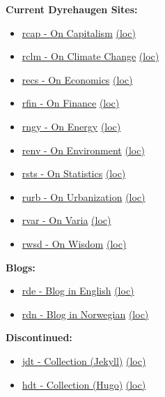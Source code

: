 \documentclass[
]{book}
\providecommand{\tightlist}{%
  \setlength{\itemsep}{0pt}\setlength{\parskip}{0pt}}
\begin{document}
\textbf{Current Dyrehaugen Sites:}

\begin{itemize}
\tightlist
\item
  \href{https://dyrehaugen.github.io/rcap}{rcap - On Capitalism} \href{http://localhost/rcap}{(loc)}
\item
  \href{https://dyrehaugen.github.io/rclm}{rclm - On Climate Change} \href{http://localhost/rclm}{(loc)}
\item
  \href{https://dyrehaugen.github.io/recs}{recs - On Economics} \href{http://localhost/recs}{(loc)}
\item
  \href{https://dyrehaugen.github.io/rngy}{rfin - On Finance} \href{http://localhost/rfin}{(loc)}
\item
  \href{https://dyrehaugen.github.io/rngy}{rngy - On Energy} \href{http://localhost/rngy}{(loc)}
\item
  \href{https://dyrehaugen.github.io/renv}{renv - On Environment} \href{http://localhost/renv}{(loc)}
\item
  \href{https://dyrehaugen.github.io/rsts}{rsts - On Statistics} \href{http://localhost/rsts}{(loc)}
\item
  \href{https://dyrehaugen.github.io/rurb}{rurb - On Urbanization} \href{http://localhost/rurb}{(loc)}
\item
  \href{https://dyrehaugen.github.io/rvar}{rvar - On Varia} \href{http://localhost/rvar}{(loc)}
\item
  \href{https://dyrehaugen.github.io/rwsd}{rwsd - On Wisdom} \href{http://localhost/rwsd}{(loc)}
\end{itemize}

\textbf{Blogs:}

\begin{itemize}
\tightlist
\item
  \href{https://dyrehaugen.github.io/rde}{rde - Blog in English} \href{http://localhost/rde}{(loc)}
\item
  \href{https://dyrehaugen.github.io/rdn}{rdn - Blog in Norwegian} \href{http://localhost/rdn}{(loc)}
\end{itemize}

\textbf{Discontinued:}

\begin{itemize}
\tightlist
\item
  \href{https://dyrehaugen.github.io/jdt}{jdt - Collection (Jekyll)} \href{http://localhost/jdt}{(loc)}
\item
  \href{https://dyrehaugen.github.io/hdt}{hdt - Collection (Hugo)} \href{http://localhost/hdt}{(loc)}
\end{itemize}
\end{document}
